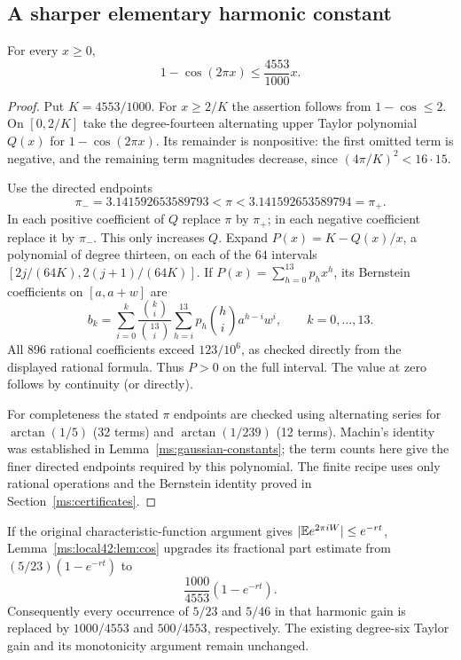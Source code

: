 \subsection{A sharper elementary harmonic constant}
\begin{lemma}\label{ms:local42:lem:cos}
For every $x\ge0$,
\[
               1-\cos(2\pi x)\le\frac{4553}{1000}x.
\]
\end{lemma}
\begin{proof}
Put $K=4553/1000$. For $x\ge2/K$ the assertion follows from
$1-\cos\le2$. On $[0,2/K]$ take the degree-fourteen alternating upper
Taylor polynomial $Q(x)$ for $1-\cos(2\pi x)$. Its remainder is nonpositive:
the first omitted term is negative, and the remaining term magnitudes
decrease, since $(4\pi/K)^2<16\cdot15$.

Use the directed endpoints
\[
 \pi_-=3.141592653589793<\pi<3.141592653589794=\pi_+.
\]
In each positive coefficient of $Q$ replace $\pi$ by $\pi_+$; in each
negative coefficient replace it by $\pi_-$. This only increases $Q$.
Expand $P(x)=K-Q(x)/x$, a polynomial of degree thirteen,
on each of the $64$ intervals $[2j/(64K),2(j+1)/(64K)]$. If
$P(x)=\sum_{h=0}^{13}p_hx^h$, its Bernstein coefficients on $[a,a+w]$ are
\[
 b_k=\sum_{i=0}^k\frac{\binom ki}{\binom{13}i}
        \sum_{h=i}^{13}p_h\binom hi a^{h-i}w^i,
               \qquad k=0,\ldots,13.
\]
All 896 rational coefficients exceed $123/10^6$, as checked directly
from the displayed rational formula. Thus
$P>0$ on the full interval. The value at zero follows by
continuity (or directly).

For completeness the stated $\pi$ endpoints are checked using alternating
series for $\arctan(1/5)$ (32 terms) and $\arctan(1/239)$ (12 terms).
Machin's identity was established in Lemma~\ref{ms:gaussian-constants};
the term counts here give the finer directed endpoints required by this
polynomial. The finite recipe uses only rational operations and the Bernstein identity
proved in Section~\ref{ms:certificates}.
\end{proof}

If the original characteristic-function argument gives
$|\mathbb E e^{2\pi iW}|\le e^{-rt}$, Lemma~\ref{ms:local42:lem:cos} upgrades its fractional
part estimate from $(5/23)(1-e^{-rt})$ to
\[
                 \frac{1000}{4553}(1-e^{-rt}).
\]
Consequently every occurrence of $5/23$ and $5/46$ in that harmonic gain is
replaced by $1000/4553$ and $500/4553$, respectively. The existing degree-six
Taylor gain and its monotonicity argument remain unchanged.

